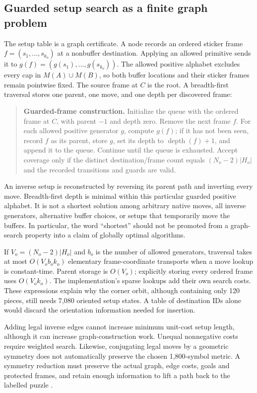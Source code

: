 \documentclass[a4paper,11pt]{article}
\begin{document}
\subsection{Guarded setup search as a finite graph problem}

The setup table is a graph certificate. A node records an ordered sticker frame \(f=(s_1,\ldots,s_{k_o})\) at a nonbuffer destination. Applying an allowed primitive sends it to \(g(f)=(g(s_1),\ldots,g(s_{k_o}))\). The allowed positive alphabet excludes every cap in \(M(A)\cup M(B)\), so both buffer locations and their sticker frames remain pointwise fixed. The source frame at \(C\) is the root. A breadth-first traversal stores one parent, one move, and one depth per discovered frame:

\begin{quote}\small
\textbf{Guarded-frame construction.}
Initialize the queue with the ordered frame at \(C\), with parent \(-1\) and depth zero. Remove the next frame \(f\). For each allowed positive generator \(g\), compute \(g(f)\); if it has not been seen, record \(f\) as its parent, store \(g\), set its depth to \(\operatorname{depth}(f)+1\), and append it to the queue. Continue until the queue is exhausted. Accept coverage only if the distinct destination/frame count equals \((N_o-2)|H_o|\) and the recorded transitions and guards are valid.
\end{quote}

An inverse setup is reconstructed by reversing its parent path and inverting every move. Breadth-first depth is minimal within this particular guarded positive alphabet. It is not a shortest solution among arbitrary native moves, all inverse generators, alternative buffer choices, or setups that temporarily move the buffers. In particular, the word ``shortest'' should not be promoted from a graph-search property into a claim of globally optimal algorithms.

If \(V_o=(N_o-2)|H_o|\) and \(b_o\) is the number of allowed generators, traversal takes at most \(O(V_o b_o k_o)\) elementary frame-coordinate transports when a move lookup is constant-time. Parent storage is \(O(V_o)\); explicitly storing every ordered frame uses \(O(V_o k_o)\). The implementation's sparse lookups add their own search costs. These expressions explain why the corner orbit, although containing only 120 pieces, still needs 7,080 oriented setup states. A table of destination IDs alone would discard the orientation information needed for insertion.

Adding legal inverse edges cannot increase minimum unit-cost setup length, although it can increase graph-construction work. Unequal nonnegative costs require weighted search. Likewise, conjugating legal moves by a geometric symmetry does not automatically preserve the chosen 1,800-symbol metric. A symmetry reduction must preserve the actual graph, edge costs, goals and protected frames, and retain enough information to lift a path back to the labelled puzzle \cite{puzzletheory}.
\end{document}
